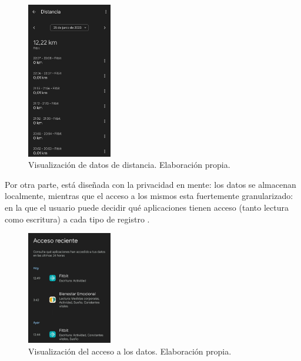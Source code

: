             \begin{figure}[h]
                \centering
                \includegraphics[width=0.33\textwidth]{figures/Health Connect lectura datos.jpg}
                \caption[Visualización de datos de distancia.]
                {Visualización de datos de distancia. Elaboración propia.}
                \label{figure:health_connect:visualizacion_datos}
            \end{figure}
            
            Por otra parte, está diseñada con la privacidad en mente: los datos se almacenan localmente, mientras que el 
            acceso a los mismos esta fuertemente granularizado: en la que el usuario puede
            decidir qué aplicaciones tienen acceso (tanto lectura como escritura) a cada tipo de registro 
            \cite{saez_google_2022}. \newline 
            
            \begin{figure}[h]
                \centering
                \includegraphics[width=0.33\textwidth]{figures/Health Connect acceso reciente.jpg}
                \caption[Visualización del acceso a los datos.]
                {Visualización del acceso a los datos. Elaboración propia.}
                \label{figure:health_connect:acceso_reciente}
            \end{figure}

